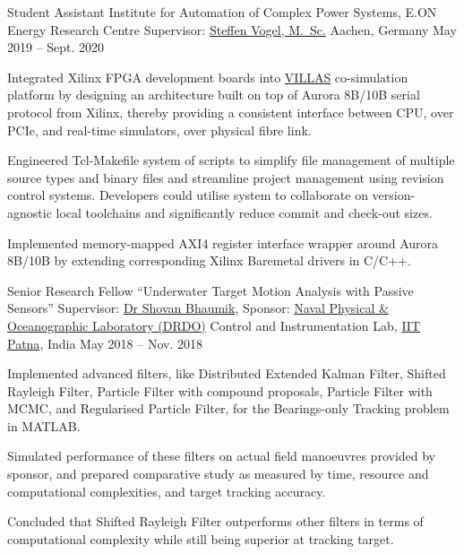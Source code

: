 \begin{cvexperience}
\cvposition
	{Student Assistant} %
	{Institute for Automation of Complex Power Systems, E.ON Energy Research Centre} %
	{Supervisor: \href{https://www.acs.eonerc.rwth-aachen.de/go/id/msul}{Steffen Vogel, M.\, Sc.}} %
	{Aachen, Germany  {\acvHeaderIconSep{}} {} } %
	{May 2019 -- Sept. 2020  {\acvHeaderIconSep{}} {} } %
	{\begin{cvitems}
		\item {Integrated Xilinx FPGA development boards into \href{https://villas.fein-aachen.org}{VILLAS} co-simulation platform by designing an architecture built on top of Aurora 8B/10B serial protocol from Xilinx, thereby providing a consistent interface between CPU, over PCIe, and real-time simulators, over physical fibre link.}
		\item {Engineered Tcl-Makefile system of scripts to simplify file management of multiple source types and binary files and streamline project management using revision control systems. Developers could utilise system to collaborate on version-agnostic local toolchains and significantly reduce commit and check-out sizes.}
		\item {Implemented memory-mapped AXI4 register interface wrapper around Aurora 8B/10B by extending corresponding Xilinx Baremetal drivers in C/C++.}
	\end{cvitems}}

\cvposition
	{Senior Research Fellow} %
	{``Underwater Target Motion Analysis with Passive Sensors''} %
	{Supervisor: \href{http://www.tutorialpoint.org/ShovanBhaumik/index.html}{Dr Shovan Bhaumik}, Sponsor: \href{https://www.drdo.gov.in/labs-and-establishments/naval-physical-oceanographic-laboratory-npol}{Naval Physical \& Oceanographic Laboratory (DRDO)}} %
	{Control and Instrumentation Lab, \href{https://www.iitp.ac.in}{IIT Patna}, India  {\acvHeaderIconSep{}} {} } %
	{May 2018 -- Nov. 2018  {\acvHeaderIconSep{}} {} } %
	{\begin{cvitems} %
		\item {Implemented advanced filters, like Distributed Extended Kalman Filter, Shifted Rayleigh Filter, Particle Filter with compound proposals, Particle Filter with MCMC, and Regularised Particle Filter, for the Bearings-only Tracking problem in MATLAB.}
		\item {Simulated performance of these filters on actual field manoeuvres provided by sponsor, and prepared comparative study as measured by time, resource and computational complexities, and target tracking accuracy.}
		\item{Concluded that Shifted Rayleigh Filter outperforms other filters in terms of computational complexity while still being superior at tracking target.}
	\end{cvitems}}


\end{cvexperience}
